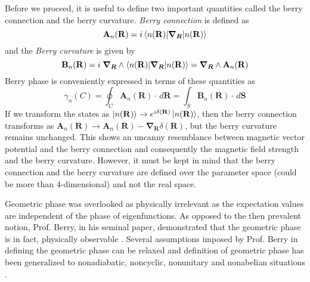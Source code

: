Before we proceed, it is useful to define two important quantities called the berry connection and the berry curvature. \emph{Berry connection} is defined as
\begin{equation}
 \mathbf{A}_{n}(\mathbf{R}) = i\braket{n(\mathbf{R})| \bm{\nabla_{R}} | n(\mathbf{R})}
\end{equation}
and the \emph{Berry curvature} is given by
\begin{equation}
 \mathbf{B}_{n}(\mathbf{R}) = i \;\bm{\nabla_{R}} \wedge \braket{n(\mathbf{R})| \bm{\nabla_{R}} | n(\mathbf{R})} = \bm{\nabla_{R}} \wedge \mathbf{A}_{n}(\mathbf{R})
\end{equation} Berry phase is conveniently expressed in terms of these quantities as
\begin{equation}
 \gamma_{n}(C)= \oint_{C}{\mathbf{A}_{n}(\mathbf{R})\cdot \, d\mathbf{R}} = \int_{S}{\mathbf{B}_{n}(\mathbf{R})\cdot \, d\mathbf{S}}
\end{equation}
If we transform the states as $\ket{n(\mathbf{R})} \rightarrow e^{i\delta(\mathbf{R})} \ket{n(\mathbf{R})}$, then the berry connection transforms as
$\mathbf{A}_{n}(\mathbf{R}) \rightarrow \mathbf{A}_{n}(\mathbf{R}) - \bm{\nabla_{R}} \delta(\mathbf{R})$, but the berry curvature remains unchanged. This shows an uncanny
resemblance between magnetic vector potential and the berry connection and consequently the magnetic field strength and the berry curvature. However, it must be kept in mind that
the berry connection and the berry curvature are defined over the parameter space (could be more than 4-dimensional) and not the real space.

Geometric phase was overlooked as physically irrelevant as the expectation values are independent of the phase of eigenfunctions. 
As opposed to the then prevalent notion, Prof. Berry, in his seminal paper, demonstrated that the geometric phase is in fact, physically observable \cite{berry1984quantal,wilczek1989geometric}.
Several assumptions imposed by Prof. Berry in defining the geometric phase can be relaxed and definition of geometric phase has been generalized to nonadiabatic, noncyclic, 
nonunitary and nonabelian situations \cite{aharonov1987phase, samuel1988general, wilczek1984appearance, mukunda1993quantum}.

